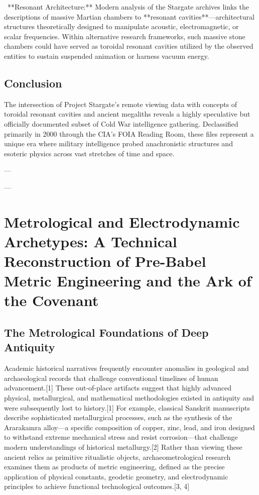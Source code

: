 \documentclass[aps,prd,11pt,onecolumn,superscriptaddress,nofootinbib,floatfix]{revtex4-2}
\begin{document}
\textbullet~**Resonant Architecture:** Modern analysis of the Stargate archives links the descriptions of massive Martian chambers to **resonant cavities**---architectural structures theoretically designed to manipulate acoustic, electromagnetic, or scalar frequencies. Within alternative research frameworks, such massive stone chambers could have served as toroidal resonant cavities utilized by the observed entities to sustain suspended animation or harness vacuum energy.



\subsection{Conclusion}
The intersection of Project Stargate's remote viewing data with concepts of toroidal resonant cavities and ancient megaliths reveals a highly speculative but officially documented subset of Cold War intelligence gathering. Declassified primarily in 2000 through the CIA's FOIA Reading Room, these files represent a unique era where military intelligence probed anachronistic structures and esoteric physics across vast stretches of time and space.




---






---


\section{Metrological and Electrodynamic Archetypes: A Technical Reconstruction of Pre-Babel Metric Engineering and the Ark of the Covenant}


\subsection{The Metrological Foundations of Deep Antiquity}
Academic historical narratives frequently encounter anomalies in geological and archaeological records that challenge conventional timelines of human advancement.[1] These out-of-place artifacts suggest that highly advanced physical, metallurgical, and mathematical methodologies existed in antiquity and were subsequently lost to history.[1] For example, classical Sanskrit manuscripts describe sophisticated metallurgical processes, such as the synthesis of the Ararakamra alloy---a specific composition of copper, zinc, lead, and iron designed to withstand extreme mechanical stress and resist corrosion---that challenge modern understandings of historical metallurgy.[2] Rather than viewing these ancient relics as primitive ritualistic objects, archaeometrological research examines them as products of metric engineering, defined as the precise application of physical constants, geodetic geometry, and electrodynamic principles to achieve functional technological outcomes.[3, 4]
\end{document}
